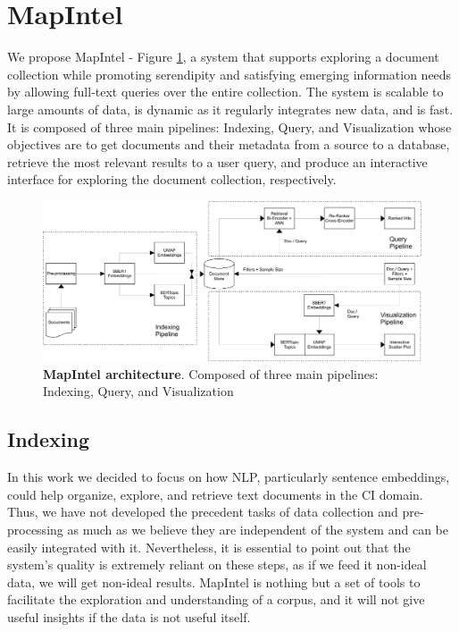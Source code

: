 \documentclass[a4paper]{article}
\begin{document}
\section{MapIntel}
We propose MapIntel - Figure \ref{system_architecture}, a system that supports exploring a document collection while promoting serendipity and satisfying emerging information needs by allowing full-text queries over the entire collection.
The system is scalable to large amounts of data, is dynamic as it regularly integrates new data, and is fast. It is composed of three main pipelines: Indexing, Query, and Visualization whose objectives are to get documents and their metadata from a source to a database, retrieve the most relevant results to a user query, and produce an interactive interface for exploring the document collection, respectively.

\begin{figure}[H]
	\centering
	\includegraphics[width=\linewidth]{./assets/system_architecture}
	\caption{\textbf{MapIntel architecture}. Composed of three main pipelines: Indexing, Query, and Visualization}
	\label{system_architecture}
\end{figure}

\subsection{Indexing} \label{indexing}
In this work we decided to focus on how NLP, particularly sentence embeddings, could help organize, explore, and retrieve text documents in the CI domain. Thus, we have not developed the precedent tasks of data collection and pre-processing as much as we believe they are independent of the system and can be easily integrated with it. Nevertheless, it is essential to point out that the system's quality is extremely reliant on these steps, as if we feed it non-ideal data, we will get non-ideal results. MapIntel is nothing but a set of tools to facilitate the exploration and understanding of a corpus, and it will not give useful insights if the data is not useful itself.
\end{document}

